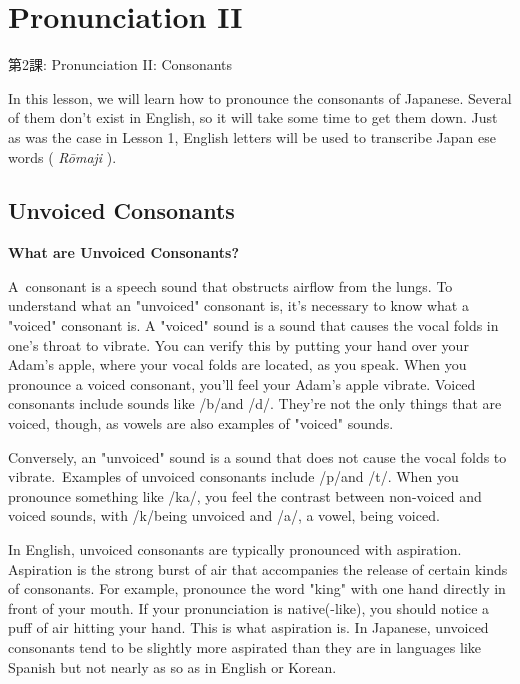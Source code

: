     
\chapter{Pronunciation II}

\begin{center}
\begin{Large}
第2課: Pronunciation II: Consonants 
\end{Large}
\end{center}
 
\par{ In this lesson, we will learn how to pronounce the consonants of Japanese. Several of them don't exist in English, so it will take some time to get them down. Just as was the case in Lesson 1, English letters will be used to transcribe Japan ese words ( \emph{Rōmaji }). }
      
\section{Unvoiced Consonants}
 
\begin{center}
\textbf{What are Unvoiced Consonants? } 
\end{center}

\par{ A consonant is a speech sound that obstructs airflow from the lungs. To understand what an "unvoiced" consonant is, it's necessary to know what a "voiced" consonant is. A "voiced" sound is a sound that causes the vocal folds in one's throat to vibrate. You can verify this by putting your hand over your Adam's apple, where your vocal folds are located, as you speak. When you pronounce a voiced consonant, you'll feel your Adam's apple vibrate. Voiced consonants include sounds like \slash b\slash  and \slash d\slash . They're not the only things that are voiced, though, as vowels are also examples of "voiced" sounds. }

\par{ Conversely, an "unvoiced" sound is a sound that does not cause the vocal folds to vibrate. Examples of unvoiced consonants include \slash p\slash  and \slash t\slash . When you pronounce something like \slash ka\slash , you feel the contrast between non-voiced and voiced sounds, with \slash k\slash  being unvoiced and \slash a\slash , a vowel, being voiced. }

\par{ In English, unvoiced consonants are typically pronounced with aspiration. Aspiration is the strong burst of air that accompanies the release of certain kinds of consonants. For example, pronounce the word "king" with one hand directly in front of your mouth. If your pronunciation is native(-like), you should notice a puff of air hitting your hand. This is what aspiration is. In Japanese, unvoiced consonants tend to be slightly more aspirated than they are in languages like Spanish but not nearly as so as in English or Korean. }


